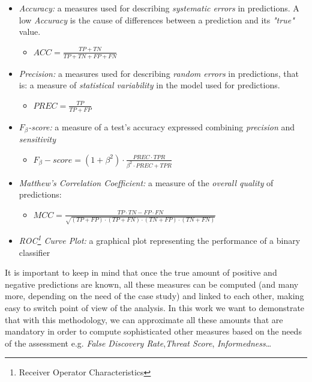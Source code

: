 \begin{itemize}
	\item \textsl{Accuracy:} a measures used for describing \textsl{systematic errors} in predictions. A low \textsl{Accuracy} is the cause of differences between a prediction and its \textsl{"true"} value.
	\begin{itemize}
		\item[] $ACC = \frac{TP+TN}{TP+TN+FP+FN}$
	\end{itemize}
	\item \textsl{Precision:} a measures used for describing \textsl{random errors} in predictions, that is: a measure of \textsl{statistical variability} in the model used for predictions.
	\begin{itemize}
	\item[] $PREC = \frac{TP}{TP+FP}$
	\end{itemize}
	\item \textsl{$F_{\beta}$-score:} a measure of a test's accuracy expressed combining \textsl{precision} and \textsl{sensitivity}
	\begin{itemize}
		\item[] $F_{\beta}-score = (1+\beta ^{2})\cdot \frac{PREC\cdot TPR}{\beta ^{2}\cdot PREC+TPR}$
	\end{itemize}
	\item \textsl{Matthew's Correlation Coefficient:} a measure of the \textsl{overall quality} of predictions:
	\begin{itemize}
		\item[] $MCC = \frac{TP\cdot TN - FP\cdot FN}{\sqrt{(TP+FP)\cdot (TP+FN)\cdot (TN+FP)\cdot (TN+FN)}}$
	\end{itemize}
	\item \textsl{ROC\footnote{Receiver Operator Characteristics} Curve Plot:} a graphical plot representing the performance of a binary classifier
\end{itemize}

It is important to keep in mind that once the true amount of positive and negative predictions are known, all these measures can be computed (and many more, depending on the need of the case study) and linked to each other, making easy to switch point of view of the analysis. In this work we want to demonstrate that with this methodology, we can approximate all these amounts that are mandatory in order to compute sophisticated other measures based on the needs of the assessment e.g. \textsl{False Discovery Rate},\textsl{Threat Score}, \textsl{Informedness}\dots \newline

